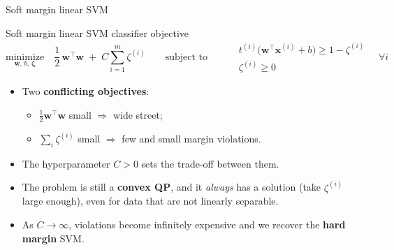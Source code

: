 \documentclass[aspectratio=169,10pt]{beamer}
\newcommand{\w}{\mathbf{w}}
\newcommand{\x}{\mathbf{x}}
\begin{document}
\begin{frame}{Soft margin linear SVM}
\begin{alertblock}{Soft margin linear SVM classifier objective}
\[
  \underset{\w,\,b,\,\bm{\zeta}}{\text{minimize}}\quad \frac12\,\w^\top\w \;+\; C\sum_{i=1}^{m}\zeta^{(i)}
  \qquad\text{subject to}\qquad
  \begin{aligned}
    & t^{(i)}\big(\w^\top\x^{(i)} + b\big) \ge 1-\zeta^{(i)}\\
    & \zeta^{(i)}\ge 0
  \end{aligned}
  \quad \forall i
\]
\end{alertblock}
\begin{itemize}
  \item Two \textbf{conflicting objectives}:
  \begin{itemize}
    \item $\tfrac12\w^\top\w$ small $\Rightarrow$ wide street;
    \item $\sum_i\zeta^{(i)}$ small $\Rightarrow$ few and small margin violations.
  \end{itemize}
  \item The hyperparameter $C>0$ sets the trade-off between them.
  \item The problem is still a \textbf{convex QP}, and it \emph{always} has a solution (take $\zeta^{(i)}$ large enough), even for data that are not linearly separable.
  \item As $C\to\infty$, violations become infinitely expensive and we recover the \textbf{hard margin} SVM.
\end{itemize}
\end{frame}
\end{document}
